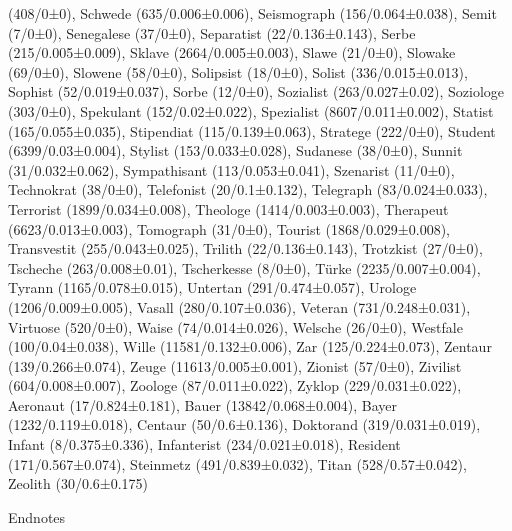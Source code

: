 \begin{styleMoutonText}
(408/0±0), Schwede (635/0.006±0.006), Seismograph (156/0.064±0.038), Semit (7/0±0), Senegalese (37/0±0), Separatist (22/0.136±0.143), Serbe (215/0.005±0.009), Sklave (2664/0.005±0.003), Slawe (21/0±0), Slowake (69/0±0), Slowene (58/0±0), Solipsist (18/0±0), Solist (336/0.015±0.013), Sophist (52/0.019±0.037), Sorbe (12/0±0), Sozialist (263/0.027±0.02), Soziologe (303/0±0), Spekulant (152/0.02±0.022), Spezialist (8607/0.011±0.002), Statist (165/0.055±0.035), Stipendiat (115/0.139±0.063), Stratege (222/0±0), Student (6399/0.03±0.004), Stylist (153/0.033±0.028), Sudanese (38/0±0), Sunnit (31/0.032±0.062), Sympathisant (113/0.053±0.041), Szenarist (11/0±0), Technokrat (38/0±0), Telefonist (20/0.1±0.132), Telegraph (83/0.024±0.033), Terrorist (1899/0.034±0.008), Theologe (1414/0.003±0.003), Therapeut (6623/0.013±0.003), Tomograph (31/0±0), Tourist (1868/0.029±0.008), Transvestit (255/0.043±0.025), Trilith (22/0.136±0.143), Trotzkist (27/0±0), Tscheche (263/0.008±0.01), Tscherkesse (8/0±0), Türke (2235/0.007±0.004), Tyrann (1165/0.078±0.015), Untertan (291/0.474±0.057), Urologe (1206/0.009±0.005), Vasall (280/0.107±0.036), Veteran (731/0.248±0.031), Virtuose (520/0±0), Waise (74/0.014±0.026), Welsche (26/0±0), Westfale (100/0.04±0.038), Wille (11581/0.132±0.006), Zar (125/0.224±0.073), Zentaur (139/0.266±0.074), Zeuge (11613/0.005±0.001), Zionist (57/0±0), Zivilist (604/0.008±0.007), Zoologe (87/0.011±0.022), Zyklop (229/0.031±0.022), Aeronaut (17/0.824±0.181), Bauer (13842/0.068±0.004), Bayer (1232/0.119±0.018), Centaur (50/0.6±0.136), Doktorand (319/0.031±0.019), Infant (8/0.375±0.336), Infanterist (234/0.021±0.018), Resident (171/0.567±0.074), Steinmetz (491/0.839±0.032), Titan (528/0.57±0.042), Zeolith (30/0.6±0.175)
\end{styleMoutonText}

\begin{styleMoutonHeadingi}
Endnotes
\end{styleMoutonHeadingi}

